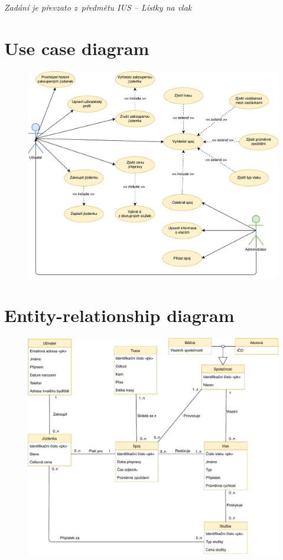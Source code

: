 \documentclass[12pt, a4paper, titlepage]{article}
\begin{document}
{\textit{Zadání je převzato z~předmětu IUS -- Lístky na vlak}

\clearpage


\section{Use case diagram}
\bigskip \bigskip \bigskip

\begin{figure}[htb]
	\centering
	\includegraphics[width=0.8\hsize]{use_case.pdf}
\end{figure}

\clearpage


\section{Entity-relationship diagram}
\bigskip \bigskip \bigskip

\begin{figure}[htb]
	\centering
	\includegraphics[width=0.8\hsize]{erd.pdf}
\end{figure}

}
\end{document}
